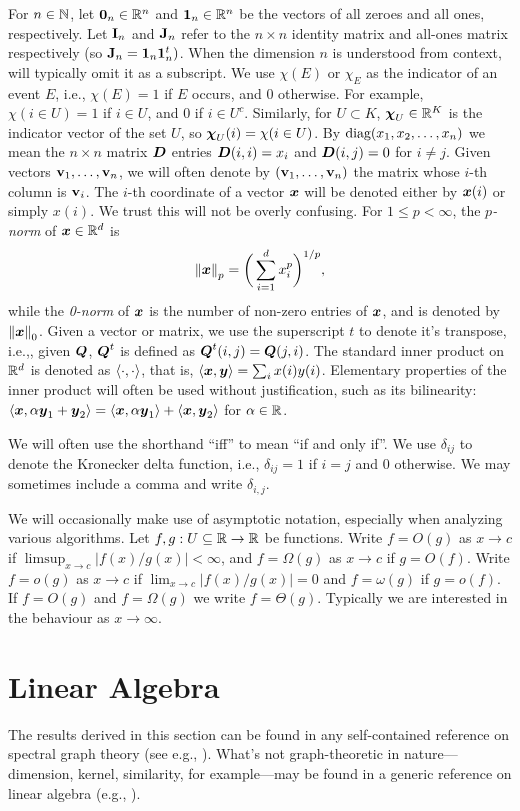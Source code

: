 For $n\in \mathbb{N}$, let $\vb{0}_n\in\mathbb{R}^n$ and $\vb{1}_n\in\mathbb{R}^n$ be the vectors of all zeroes and all ones, respectively. Let $\vb{I}_n$ and $\vb{J}_n$  refer to the $n\times n$ identity matrix and all-ones matrix respectively (so $\vb{J}_n=\vb{1}_n\vb{1}_n^t)$. When the dimension $n$ is understood from context, will typically omit it as a subscript. We use $\chi(E)$ or $\chi_E$ as the indicator of an event $E$, i.e., $\chi(E)=1$ if $E$ occurs, and 0 otherwise. For example, $\chi(i\in U)=1$ if $i\in U$, and 0 if $i\in U^c$.  Similarly, for $U\subset K$,  $\boldsymbol{\chi}_U\in\mathbb{R}^K$ is the indicator vector of the set $U$, so $\boldsymbol{\chi}_U(i)=\chi(i\in U)$. 
By $\text{diag}(x_1,x_2,\dots,x_n)$ we mean the $n\times n$ matrix $\vb*{D}$ entries $\vb*{D}(i,i)=x_i$ and $\vb*{D}(i,j)=0$ for $i\neq j$. Given vectors $\vb{v}_1,\dots,\vb{v}_n$, we will often denote by $(\vb{v}_1,\dots,\vb{v}_n)$ the matrix whose $i$-th column is $\vb{v}_i$. The $i$-th coordinate of a vector $\vb*{x}$ will be denoted either by $\vb*{x}(i)$ or simply $x(i)$. We trust this will not be overly confusing.  For $1\leq p<\infty$, the \emph{$p$-norm} of $\vb*{x}\in \mathbb{R}^d$ is 
\[\norm{\vb*{x}}_p = \bigg(\sum_{i=1}^d x_i^p\bigg)^{1/p},\]
while the \emph{0-norm} of $\vb*{x}$ is the number of non-zero entries of $\vb*{x}$, and is denoted by $\norm{\vb*{x}}_0$.  Given a vector or matrix, we use the superscript $t$ to denote it's transpose, i.e.,, given $\vb*{Q}$, $\vb*{Q}^t$ is defined as $\vb*{Q}^t(i,j) = \vb*{Q}(j,i)$. The standard inner product on $\mathbb{R}^d$ is denoted as $\langle\cdot,\cdot\rangle$, that is, $\langle \vb*{x},\vb*{y}\rangle = \sum_i x(i)y(i)$. Elementary properties of the inner product will often be used without justification, such as its bilinearity: $\langle \vb*{x},\alpha\vb*{y}_1+\vb*{y}_2\rangle  = \langle \vb*{x},\alpha\vb*{y}_1\rangle + \langle \vb*{x},\vb*{y}_2\rangle$ for $\alpha\in\mathbb{R}$.  

We will often use the shorthand ``iff'' to mean ``if and only if''. We use $\delta_{ij}$ to denote the Kronecker delta function, i.e., $\delta_{ij} = 1$ if $i=j$ and 0 otherwise. We may sometimes include a comma and write $\delta_{i,j}$. 

We will occasionally make use of asymptotic notation,  especially when analyzing various algorithms. Let $f,g:U\subseteq \mathbb{R} \to \mathbb{R}$ be functions. Write $f=O(g)$ as $x\to c$ if $\limsup_{x\to c}|f(x)/g(x)|<\infty$, and $f=\Omega(g)$ as $x\to c$ if $g=O(f)$. Write $f=o(g)$ as $x\to c$ if $\lim_{x\to c}|f(x)/g(x)|=0$ and $f=\omega(g)$ if $g=o(f)$. If $f=O(g)$ and $f=\Omega(g)$ we write $f=\Theta(g)$. Typically we are interested in the behaviour as $x\to\infty$. 

\section{Linear Algebra}
\label{sec:background_linear}
The results derived in this section can be found in any self-contained reference on spectral graph theory (see e.g., \cite{spielman2009spectral,chung1997spectral}). What's not graph-theoretic in nature---dimension, kernel, similarity, for example---may be found in a generic reference on linear algebra (e.g.,  \cite{axler1997linear}). 

